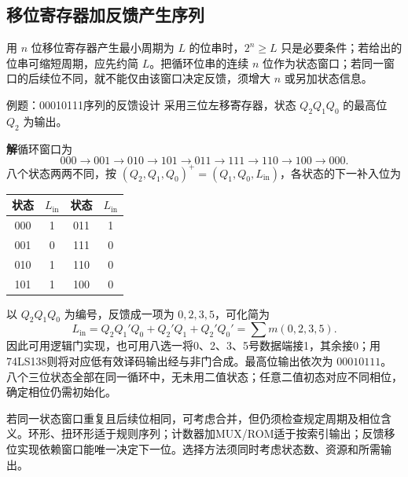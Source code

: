 \documentclass[UTF8,fontset=none,zihao=-4,a4paper]{ctexart}
\newcommand{\sol}{\par\noindent\textbf{解}\quad}
\begin{document}
\subsection{移位寄存器加反馈产生序列}
用 $n$ 位移位寄存器产生最小周期为 $L$ 的位串时，$2^n\ge L$ 只是必要条件；若给出的位串可缩短周期，应先约简 $L$。把循环位串的连续 $n$ 位作为状态窗口；若同一窗口的后续位不同，就不能仅由该窗口决定反馈，须增大 $n$ 或另加状态信息。
\begin{infobox}{例题：00010111序列的反馈设计}
采用三位左移寄存器，状态 $Q_2Q_1Q_0$ 的最高位 $Q_2$ 为输出。
\end{infobox}
\sol 循环窗口为
\[
000\to001\to010\to101\to011\to111\to110\to100\to000.
\]
八个状态两两不同，按 $(Q_2,Q_1,Q_0)^+=(Q_1,Q_0,L_{\mathrm{in}})$，各状态的下一补入位为
\begin{center}
\begin{tabular}{cc cc}
\toprule 状态&$L_{\mathrm{in}}$&状态&$L_{\mathrm{in}}$\\\midrule
000&1&011&1\\001&0&111&0\\010&1&110&0\\101&1&100&0\\\bottomrule
\end{tabular}
\end{center}
以 $Q_2Q_1Q_0$ 为编号，反馈成一项为 $0,2,3,5$，可化简为
\[
L_{\mathrm{in}}=Q_2Q_1'Q_0+Q_2'Q_1+Q_2'Q_0'
=\sum m(0,2,3,5).
\]
因此可用逻辑门实现，也可用八选一将0、2、3、5号数据端接1，其余接0；用74LS138则将对应低有效译码输出经与非门合成。最高位输出依次为 $00010111$。八个三位状态全部在同一循环中，无未用二值状态；任意二值初态对应不同相位，确定相位仍需初始化。

若同一状态窗口重复且后续位相同，可考虑合并，但仍须检查规定周期及相位含义。环形、扭环形适于规则序列；计数器加MUX/ROM适于按索引输出；反馈移位实现依赖窗口能唯一决定下一位。选择方法须同时考虑状态数、资源和所需输出。

\Needspace{110mm}
\end{document}
